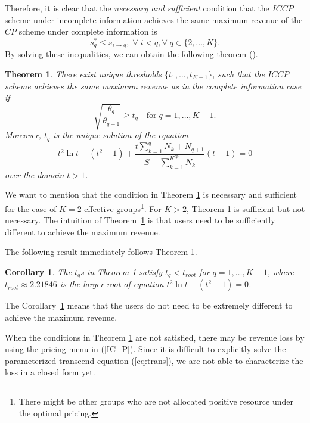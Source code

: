\documentclass[twocolumn,10pt,twosided]{IEEEtran}
\newtheorem{corollary}{Corollary}
\newtheorem{theorem}{Theorem}
\begin{document}
Therefore, it is clear that the \emph{necessary and sufficient}
condition that the $ICCP$ scheme under incomplete information achieves the same maximum revenue of the $CP$ scheme
under complete information is
\begin{equation}
    s^*_q\le s_{i\rightarrow q}, \;\forall\;i<q, \forall\; q\in \{2,\dots,K\}.
\label{IC2}
\end{equation}
By solving these inequalities, we can obtain the following theorem
().

\begin{theorem}
\label{the:IC}
There exist unique thresholds $\{t_{1},\ldots,\!t_{K\!-1}\!\}$, such that the $ICCP$ scheme achieves
the same maximum revenue as in the complete information case if
$$\sqrt{\frac{\theta_{q}}{\theta_{q+1}}}\geq t_{q}\quad\text{for}\;q\!=\!1,\dots,K-1.$$
 Moreover, $t_{q}$ is the unique solution of
the equation
$$t^2\ln t-(t^2-1)+
\frac{t\sum_{k=1}^{q}N_k+N_{q+1}}{S+\sum_{k=1}^{K^{cp}}N_k}(t-1)=0$$
over the domain $t>1$.
\end{theorem}

We want to mention that the condition in Theorem \ref{the:IC} is
necessary and sufficient for the case of $K=2$ effective
groups\footnote{There might be other groups who are not allocated
positive resource under the optimal pricing.}. For $K>2$, Theorem
\ref{the:IC} is sufficient but not necessary. The intuition of Theorem~\ref{the:IC} is that users need to be sufficiently different to achieve the maximum revenue.


The following result immediately follows Theorem \ref{the:IC}.
\begin{corollary}
\label{cor:icn}
The $t_q$s in Theorem \ref{the:IC} satisfy
$t_q<t_{root}$ for $q=1,\ldots,K-1$, where $t_{root}\approx
2.21846$ is the larger root of equation $t^2\ln t-(t^2-1)=0$.
\end{corollary}

The Corollary~\ref{cor:icn} means that the users do not need to be extremely different to achieve the maximum revenue.



When the conditions in Theorem \ref{the:IC} are not satisfied, there
may be revenue loss by using the pricing menu in (\ref{IC_P}). Since it is difficult to explicitly solve the parameterized transcend equation
(\ref{eq:trans}), we are not able to characterize the loss in a closed form yet.
\end{document}
